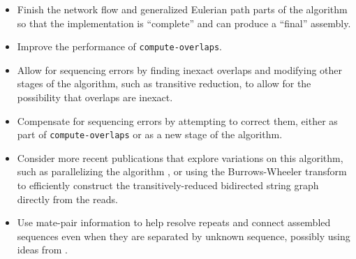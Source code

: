 \documentclass[12pt]{article}
\newcommand{\ProgramName}[1]{{\tt #1}}
\begin{document}
\begin{itemize}
\item Finish the network flow and generalized Eulerian path parts of the
algorithm so that the implementation is ``complete'' and can produce a ``final''
assembly.
\item Improve the performance of \ProgramName{compute-overlaps}.
\item Allow for sequencing errors by finding inexact overlaps and modifying other
stages of the algorithm, such as transitive reduction, to allow for the
possibility that overlaps are inexact.
\item Compensate for sequencing errors by attempting to correct them, either as
part of \ProgramName{compute-overlaps} or as a new stage of the algorithm.
\item Consider more recent publications that explore variations on this
algorithm, such as parallelizing the algorithm \cite{Jackson2008}, or using the
Burrows-Wheeler transform to efficiently construct the transitively-reduced
bidirected string graph directly from the reads\cite{Simpson2010}.
\item Use mate-pair information to help resolve repeats and connect assembled
sequences even when they are separated by unknown sequence, possibly using ideas
from \cite{Medvedev2009}.
\end{itemize}



\end{document}
